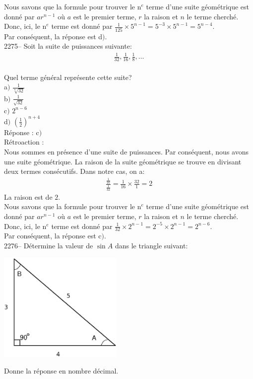 \documentclass[letterpaper, 12pt]{article}
\begin{document}
Nous savons que la formule pour trouver le n$^{e}$ terme d'une suite g\'eom\'etrique est donn\'e par $ar^{n-1}$ o\`u $a$ est le premier terme, $r$ la raison et $n$ le terme cherch\'e. Donc, ici, le n$^{e}$ terme est donn\'e par $\frac{1}{125}\times 5^{n-1}= 5^{-3}\times 5^{n-1}=5^{n-4}$.\\
Par cons\'equent, la r\'eponse est d$)$.\\

2275-- Soit la suite de puissances suivante:\\
\begin{eqnarray*}
\frac{1}{32}, \frac{1}{16},\frac{1}{8}, \ldots
\end{eqnarray*}\\
Quel terme g\'en\'eral repr\'esente cette suite?\\

a$)$ $\frac{1}{\sqrt[n]{32}}$ \\[2mm]
b$)$ $\frac{1}{\sqrt{32}}$\\[2mm]
c$)$ $2^{n-6}$\\[2mm]
d$)$ $\left( \frac{1}{2}\right) ^{n+4}$\\

R\'eponse : c$)$\\

R\'etroaction :\\
Nous sommes en pr\'esence d'une suite de puissances. Par cons\'equent, nous avons une suite g\'eom\'etrique. La raison de la suite g\'eom\'etrique se trouve en divisant deux termes cons\'ecutifs. Dans notre cas, on a:
\begin{eqnarray*}
 \frac{\frac{1}{16}}{\frac{1}{32}}=\frac{1}{16}\times \frac{32}{1}= 2
\end{eqnarray*}
La raison est de $2$.\\

Nous savons que la formule pour trouver le n$^{e}$ terme d'une suite g\'eom\'etrique est donn\'e par $ar^{n-1}$ o\`u $a$ est le premier terme, $r$ la raison et $n$ le terme cherch\'e. Donc, ici, le n$^{e}$ terme est donn\'e par $\frac{1}{32}\times 2^{n-1}=2^{-5} \times 2^{n-1} =2^{n-6}$.\\
Par cons\'equent, la r\'eponse est c$)$.\\

2276-- D\'etermine la valeur de $\sin{A}$ dans le triangle suivant:
\begin{center}
 \includegraphics[width=6cm,bb=14 14 445 371]{Triangle_rectangle2276.eps}
\end{center}
Donne la r\'eponse en nombre d\'ecimal.\\
\end{document}
